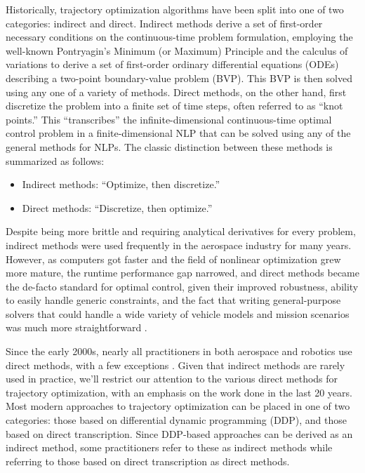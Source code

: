 \documentclass[../root.tex]{subfiles}
\begin{document}
Historically, trajectory optimization algorithms have been split into one of two categories:
indirect and direct. Indirect methods derive a set of first-order necessary conditions on the 
continuous-time problem formulation, employing the well-known Pontryagin's Minimum (or Maximum)
Principle and the calculus of variations to derive a set of first-order ordinary differential 
equations (ODEs) describing a two-point boundary-value problem (BVP). This BVP is then solved
using any one of a variety of methods. Direct methods, on the other hand, first discretize the 
problem into a finite set of time steps, often referred to as ``knot points.'' This ``transcribes''
the infinite-dimensional continuous-time optimal control problem in a finite-dimensional NLP that
can be solved using any of the general methods for NLPs. The classic distinction between these 
methods is summarized as follows:
\begin{itemize}
	\item Indirect methods: ``Optimize, then discretize.''
	\item Direct methods: ``Discretize, then optimize.''
\end{itemize}

Despite being more brittle and requiring analytical derivatives for every problem, indirect methods 
were used frequently in the aerospace industry for many years. However, as computers got faster and 
the field of nonlinear optimization grew more mature, the runtime performance gap narrowed, and direct
methods became the de-facto standard for optimal control, given their improved robustness, ability to 
easily handle generic constraints, and the fact that writing general-purpose solvers that could
handle a wide variety of vehicle models and mission scenarios was much more straightforward \cite{betts_Survey_1998}.

Since the early 2000s, nearly all practitioners in both aerospace and robotics use direct methods, 
with a few exceptions \cite{antony_Rapid_2017}. Given that indirect methods are rarely used in practice, 
we'll restrict our attention to the various direct methods for trajectory optimization, with an 
emphasis on the work done in the last 20 years. Most modern approaches to trajectory optimization 
can be placed in one of two categories: those based on differential dynamic programming (DDP), and
those based on direct transcription. Since DDP-based approaches can be derived as an indirect method, 
some practitioners refer to these as indirect methods while referring to those based on direct 
transcription as direct methods. 
\end{document}
